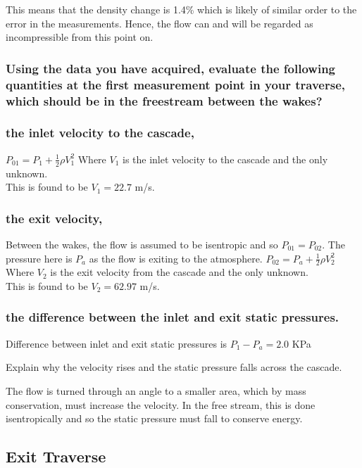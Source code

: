\documentclass{article}
\begin{document}
This means that the density change is 1.4\% which is likely of similar order to the error in the measurements.
Hence, the flow can and will be regarded as incompressible from this point on. %

\subsubsection{Using the data you have acquired, evaluate the following quantities at the first
measurement point in your traverse, which should be in the freestream between the wakes?}

\subsubsection{the inlet velocity to the cascade,}
$P_{01} = P_1 + \frac{1}{2} \rho V_{1}^2$
Where $V_1$ is the inlet velocity to the cascade and the only unknown.\\
This is found to be $V_1 = 22.7$ m/s.

\subsubsection{the exit velocity,}
Between the wakes, the flow is assumed to be isentropic and so $P_{01} = P_{02}$.
The pressure here is $P_a$ as the flow is exiting to the atmosphere.
$P_{02} = P_a + \frac{1}{2} \rho V_{2}^2$
Where $V_2$ is the exit velocity from the cascade and the only unknown.\\
This is found to be $V_2 = 62.97$ m/s.

\subsubsection{the difference between the inlet and exit static pressures.}

Difference between inlet and exit static pressures is $P_1 - P_a = 2.0$ KPa

Explain why the velocity rises and the static pressure falls across the cascade.

The flow is turned through an angle to a smaller area, which by mass conservation, must increase the velocity.
In the free stream, this is done isentropically and so the static pressure must fall to conserve energy.

\subsection{Exit Traverse}
\end{document}
